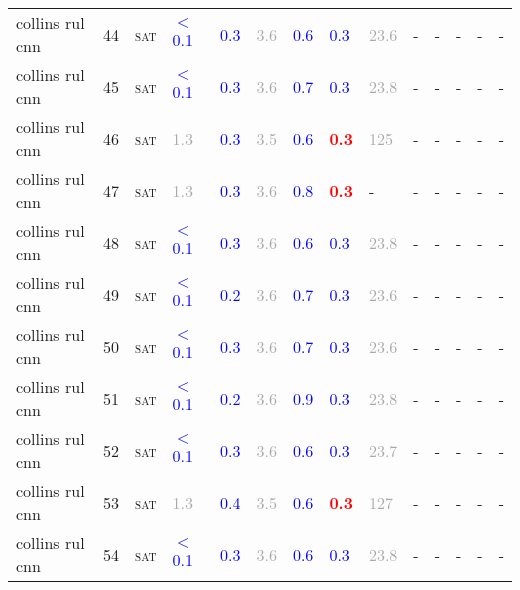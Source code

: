 \begin{center}
{\begin{longtable}{@{}llllllllllllll@{}}
collins rul cnn & 44 & \textsc{sat} & \textcolor{blue}{$<$0.1} & \textcolor{blue}{0.3} & \textcolor{darkgray}{3.6} & \textcolor{blue}{0.6} & \textcolor{blue}{0.3} & \textcolor{darkgray}{23.6} & - & - & - & - & - \\
collins rul cnn & 45 & \textsc{sat} & \textcolor{blue}{$<$0.1} & \textcolor{blue}{0.3} & \textcolor{darkgray}{3.6} & \textcolor{blue}{0.7} & \textcolor{blue}{0.3} & \textcolor{darkgray}{23.8} & - & - & - & - & - \\
collins rul cnn & 46 & \textsc{sat} & \textcolor{darkgray}{1.3} & \textcolor{blue}{0.3} & \textcolor{darkgray}{3.5} & \textcolor{blue}{0.6} & \textbf{\textcolor{red}{0.3}} & \textcolor{darkgray}{125} & - & - & - & - & - \\
collins rul cnn & 47 & \textsc{sat} & \textcolor{darkgray}{1.3} & \textcolor{blue}{0.3} & \textcolor{darkgray}{3.6} & \textcolor{blue}{0.8} & \textbf{\textcolor{red}{0.3}} & - & - & - & - & - & - \\
collins rul cnn & 48 & \textsc{sat} & \textcolor{blue}{$<$0.1} & \textcolor{blue}{0.3} & \textcolor{darkgray}{3.6} & \textcolor{blue}{0.6} & \textcolor{blue}{0.3} & \textcolor{darkgray}{23.8} & - & - & - & - & - \\
collins rul cnn & 49 & \textsc{sat} & \textcolor{blue}{$<$0.1} & \textcolor{blue}{0.2} & \textcolor{darkgray}{3.6} & \textcolor{blue}{0.7} & \textcolor{blue}{0.3} & \textcolor{darkgray}{23.6} & - & - & - & - & - \\
collins rul cnn & 50 & \textsc{sat} & \textcolor{blue}{$<$0.1} & \textcolor{blue}{0.3} & \textcolor{darkgray}{3.6} & \textcolor{blue}{0.7} & \textcolor{blue}{0.3} & \textcolor{darkgray}{23.6} & - & - & - & - & - \\
collins rul cnn & 51 & \textsc{sat} & \textcolor{blue}{$<$0.1} & \textcolor{blue}{0.2} & \textcolor{darkgray}{3.6} & \textcolor{blue}{0.9} & \textcolor{blue}{0.3} & \textcolor{darkgray}{23.8} & - & - & - & - & - \\
collins rul cnn & 52 & \textsc{sat} & \textcolor{blue}{$<$0.1} & \textcolor{blue}{0.3} & \textcolor{darkgray}{3.6} & \textcolor{blue}{0.6} & \textcolor{blue}{0.3} & \textcolor{darkgray}{23.7} & - & - & - & - & - \\
collins rul cnn & 53 & \textsc{sat} & \textcolor{darkgray}{1.3} & \textcolor{blue}{0.4} & \textcolor{darkgray}{3.5} & \textcolor{blue}{0.6} & \textbf{\textcolor{red}{0.3}} & \textcolor{darkgray}{127} & - & - & - & - & - \\
collins rul cnn & 54 & \textsc{sat} & \textcolor{blue}{$<$0.1} & \textcolor{blue}{0.3} & \textcolor{darkgray}{3.6} & \textcolor{blue}{0.6} & \textcolor{blue}{0.3} & \textcolor{darkgray}{23.8} & - & - & - & - & - \\

\end{longtable}}
\end{center}
